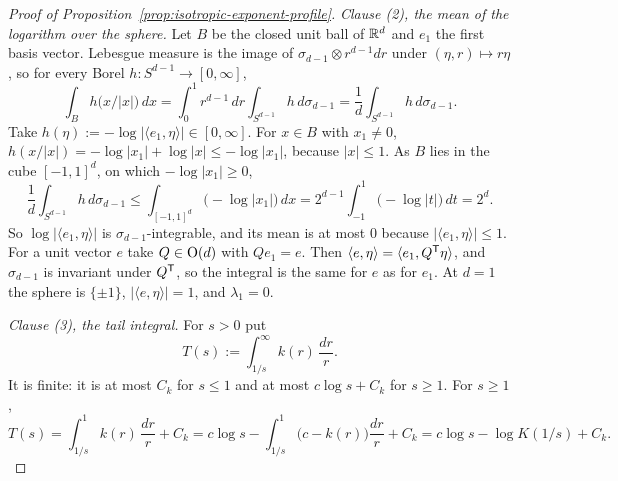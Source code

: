 \begin{proof}[Proof of Proposition~\ref{prop:isotropic-exponent-profile}]
\emph{Clause (2), the mean of the logarithm over the sphere.} Let $B$ be the closed unit ball of
$\mathbb{R}^d$ and $e_1$ the first basis vector. Lebesgue measure is the image of
$\sigma_{d-1} \otimes r^{d-1}dr$ under $(\eta, r) \mapsto r\eta$, so for every Borel
$h : S^{d-1} \to [0,\infty]$,
\[
  \int_B h\bigl(x/|x|\bigr)\,dx = \int_0^1 r^{d-1}\,dr\int_{S^{d-1}}h\,d\sigma_{d-1}
   = \frac1d\int_{S^{d-1}}h\,d\sigma_{d-1} .
\]
Take $h(\eta) := -\log|\langle e_1,\eta\rangle| \in [0,\infty]$. For $x \in B$ with $x_1 \ne 0$,
$h(x/|x|) = -\log|x_1| + \log|x| \le -\log|x_1|$, because $|x| \le 1$. As $B$ lies in the cube
$[-1,1]^d$, on which $-\log|x_1| \ge 0$,
\[
  \frac1d\int_{S^{d-1}}h\,d\sigma_{d-1} \le \int_{[-1,1]^d}\bigl(-\log|x_1|\bigr)\,dx
   = 2^{d-1}\int_{-1}^{1}\bigl(-\log|t|\bigr)\,dt = 2^{d} .
\]
So $\log|\langle e_1,\eta\rangle|$ is $\sigma_{d-1}$-integrable, and its mean is at most $0$
because $|\langle e_1,\eta\rangle| \le 1$. For a unit vector $e$ take $Q \in \mathrm{O}(d)$ with
$Qe_1 = e$. Then $\langle e,\eta\rangle = \langle e_1, Q^{\mathsf{T}}\eta\rangle$, and $\sigma_{d-1}$ is
invariant under $Q^{\mathsf{T}}$, so the integral is the same for $e$ as for $e_1$. At $d = 1$ the
sphere is $\{\pm1\}$, $|\langle e,\eta\rangle| = 1$, and $\lambda_1 = 0$.

\emph{Clause (3), the tail integral.} For $s > 0$ put
\[
  T(s) := \int_{1/s}^{\infty}k(r)\,\frac{dr}{r} .
\]
It is finite: it is at most $C_k$ for $s \le 1$ and at most $c\log s + C_k$ for $s \ge 1$. For
$s \ge 1$,
\begin{equation}\label{eq:profile-tail}
  T(s) = \int_{1/s}^{1}k(r)\,\frac{dr}{r} + C_k
       = c\log s - \int_{1/s}^{1}\bigl(c - k(r)\bigr)\frac{dr}{r} + C_k
       = c\log s - \log K(1/s) + C_k .
\end{equation}


\end{proof}
